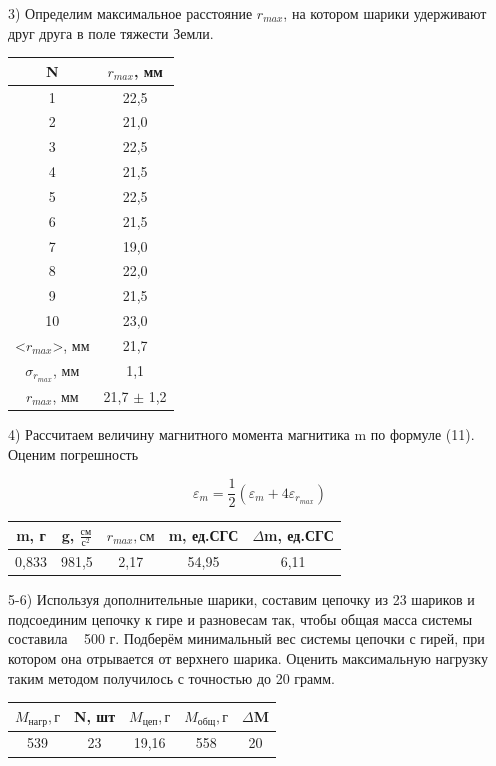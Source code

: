 \documentclass[a4paper,12pt]{article}
\begin{document}
3) Определим максимальное расстояние $r_{max}$, на котором шарики удерживают друг друга в поле тяжести Земли.

\begin{center}
\begin{tabular}{|c|c|}
	\hline
	N & $r_{max}$, мм \\
	\hline
	1 & 22,5 \\
	\hline
	2 & 21,0 \\
	\hline
	3 & 22,5 \\
	\hline
	4 & 21,5 \\
	\hline
	5 & 22,5 \\
	\hline
	6 & 21,5 \\
	\hline
	7 & 19,0 \\
	\hline
	8 & 22,0 \\
	\hline
	9 & 21,5 \\
	\hline
	10 & 23,0 \\
	\hline
	<$r_{max}$>, мм & 21,7 \\
	\hline
	$\sigma_{r_{max}}$, мм & 1,1\\
	\hline
	$r_{max}$, мм & 21,7 $\pm$ 1,2 \\
	\hline
\end{tabular}
\end{center}

4) Рассчитаем величину магнитного момента магнитика m по формуле (11). Оценим погрешность 

$$ \varepsilon_m = \frac{1}{2}(\varepsilon_m + 4\varepsilon_{r_{max}})  $$

\begin{center}
\begin{tabular}{|c|c|c|c|c|}
	\hline
	m, г & g, $\frac{см}{с^2}$ & $r_{max}, см$ & m, ед.СГС & $\Delta$m, ед.СГС \\
	\hline
	0,833 & 981,5 & 2,17 & 54,95 & 6,11 \\
	\hline
\end{tabular}
\end{center}

5-6) Используя дополнительные шарики, составим цепочку из 23 шариков и подсоединим цепочку к гире и разновесам так, чтобы общая масса системы составила ~ 500 г. Подберём минимальный вес системы цепочки с гирей, при котором она отрывается от верхнего шарика. Оценить максимальную нагрузку таким методом получилось с точностью до 20 грамм.  

\begin{center}
\begin{tabular}{|c|c|c|c|c|}
	\hline
	$M_{нагр}, г$ &  N, шт & $M_{цеп}, г$ & $M_{общ}, г$ & $\Delta$M \\
	\hline
	539 & 23 & 19,16 & 558 & 20 \\
	\hline
\end{tabular}
\end{center}
\end{document}
